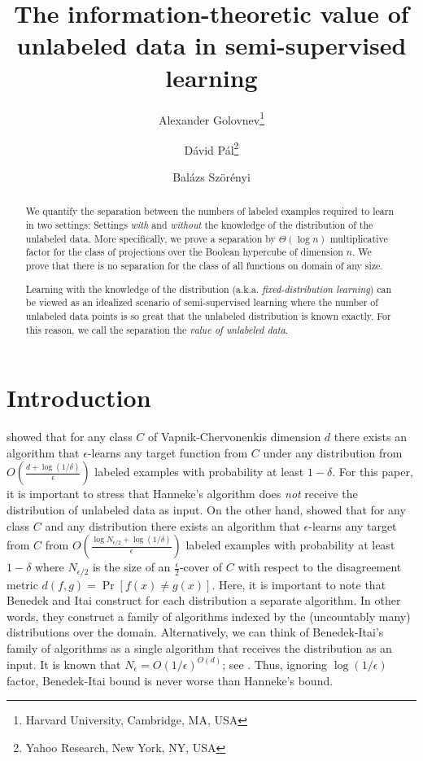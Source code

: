 \documentclass[11pt]{article}
\begin{document}
\title{The information-theoretic value of unlabeled data in semi-supervised learning}
\author{Alexander Golovnev\thanks{Harvard University, Cambridge, MA, USA} \and D\'avid P\'al\thanks{Yahoo Research, New York, NY, USA} \and Bal\'azs Sz\"or\'enyi\footnotemark[2]}

\maketitle


\begin{abstract}
We quantify the separation between the numbers of labeled examples required to
learn in two settings: Settings \emph{with} and \emph{without} the knowledge of
the distribution of the unlabeled data. More specifically, we prove a separation
by $\Theta(\log n)$ multiplicative factor for the class of projections over
the Boolean hypercube of dimension $n$. We prove that there is no separation
for the class of all functions on domain of any size.

Learning with the knowledge of the distribution (a.k.a. \emph{fixed-distribution
learning}) can be viewed as an idealized scenario of semi-supervised learning
where the number of unlabeled data points is so great that the unlabeled
distribution is known exactly. For this reason, we call the separation the
\emph{value of unlabeled data}.
\end{abstract}



\section{Introduction}
\label{section:introduction}

\citet{Hanneke-2016} showed that for any class $C$ of Vapnik-Chervonenkis
dimension $d$ there exists an algorithm that $\epsilon$-learns any target
function from $C$ under any distribution from $O\left(\frac{d +
\log(1/\delta)}{\epsilon}\right)$ labeled examples with probability at least
$1-\delta$. For this paper, it is important to stress that Hanneke's algorithm
does \emph{not} receive the distribution of unlabeled data as input. On the
other hand, \citet{Benedek-Itai-1991} showed that for any class $C$ and any
distribution there exists an algorithm that $\epsilon$-learns any target from
$C$ from $O \left( \frac{\log N_{\epsilon/2} + \log
(1/\delta)}{\epsilon}\right)$ labeled examples with probability at least
$1-\delta$ where $N_{\epsilon/2}$ is the size of an $\frac{\epsilon}{2}$-cover
of $C$ with respect to the disagreement metric $d(f,g) = \Pr[f(x) \neq g(x)]$.
Here, it is important to note that Benedek and Itai construct for each
distribution a separate algorithm. In other words, they construct a family of
algorithms indexed by the (uncountably many) distributions over the domain.
Alternatively, we can think of Benedek-Itai's family of algorithms as a single
algorithm that receives the distribution as an input. It is known that
$N_\epsilon = O(1/\epsilon)^{O(d)}$; see \citet{Dudley-1978}. Thus, ignoring
$\log(1/\epsilon)$ factor, Benedek-Itai bound is never worse than Hanneke's
bound.
\end{document}
